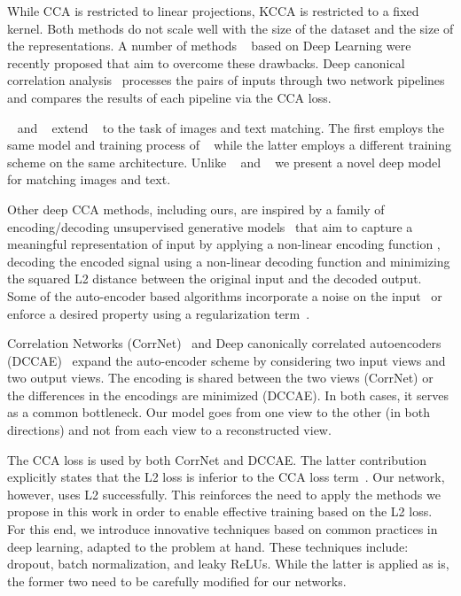 \documentclass[10pt,twocolumn,letterpaper]{article}
\begin{document}
While CCA is restricted to linear projections, KCCA is restricted to a fixed kernel. Both methods do not scale well with the size of the dataset and the size of the representations. A number of methods ~\cite{deepcca,dccae,chandar2016correlational,mae} based on Deep Learning were recently proposed that aim to overcome these drawbacks. Deep canonical correlation analysis~\cite{deepcca} processes the pairs of inputs through two network pipelines and compares the results of each pipeline via the CCA loss. 

~\cite{dcca_text} and ~\cite{DBLP:journals/corr/WangLL15} extend ~\cite{deepcca} to the task of images and text matching. The first employs the same model and training process of ~\cite{deepcca} while the latter employs a different training scheme on the same architecture. Unlike ~\cite{dcca_text} and ~\cite{DBLP:journals/corr/WangLL15} we present a novel deep model for matching images and text.

Other deep CCA methods, including ours, are inspired by a family of encoding/decoding unsupervised generative models~\cite{ae,ae1,sae,denois,sdenois} that aim to capture a meaningful representation of input  by applying a non-linear encoding function , decoding the encoded signal using a non-linear decoding function  and minimizing the squared L2 distance between the original input and the decoded output. Some of the auto-encoder based algorithms incorporate a noise on the input~\cite{denois,sdenois} or enforce a desired property using a regularization term~\cite{sae}. 

Correlation Networks (CorrNet)~\cite{chandar2016correlational} and Deep canonically correlated autoencoders (DCCAE)~\cite{dccae} expand the auto-encoder scheme by considering two input views and two output views. The encoding is shared between the two views (CorrNet) or the differences in the encodings are minimized (DCCAE). In both cases, it serves as a common bottleneck. Our model goes from one view to the other (in both directions) and not from each view to a reconstructed view. 

The CCA loss is used by both CorrNet and DCCAE. The latter contribution explicitly states that the L2 loss is inferior to the CCA loss term~\cite{dccae}. Our network, however, uses L2 successfully. This reinforces the need to apply the methods we propose in this work in order to enable effective training based on the L2 loss. For this end, we introduce innovative techniques based on common practices in deep learning, adapted to the problem at hand. These techniques include: dropout, batch normalization, and leaky ReLUs. While the latter is applied as is, the former two need to be carefully modified for our networks.
\end{document}
